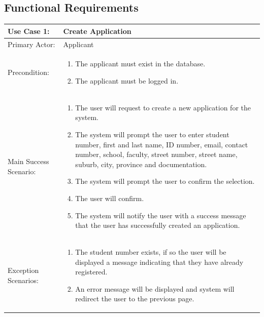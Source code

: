 \documentclass{article}
\begin{document}
\subsection{Functional Requirements}
\begin{tabular} {| m{5cm} | m{10cm} |}
\hline
Use Case 1: & Create Application \\
\hline
Primary Actor: & Applicant \\
\hline
Precondition: & \begin{enumerate} \itemsep0em \item The applicant must exist in the database.
\item The applicant must be logged in. 
\end{enumerate} \\
\hline
Main Success Scenario: & \begin{enumerate} \itemsep0em \item The user will request to create a new application for the system. 
\item The system will prompt the user to enter student number, first and last name, ID number, email, contact number, school, faculty, street number, street name, suburb, city, province and documentation.
\item The system will prompt the user to confirm the selection.
\item The user will confirm.
\item The system will notify the user with a success message that the user has successfully created an application.
\end{enumerate}\\
\hline
Exception Scenarios: & \begin{enumerate}
\itemsep0em \item The student number exists, if so the user will be displayed a message indicating that they have already registered.
\item An error message will be displayed and system will redirect the user to the previous page.
\end{enumerate} \\
\hline
\end{tabular}
\\ \\ \\ \\
\end{document}
